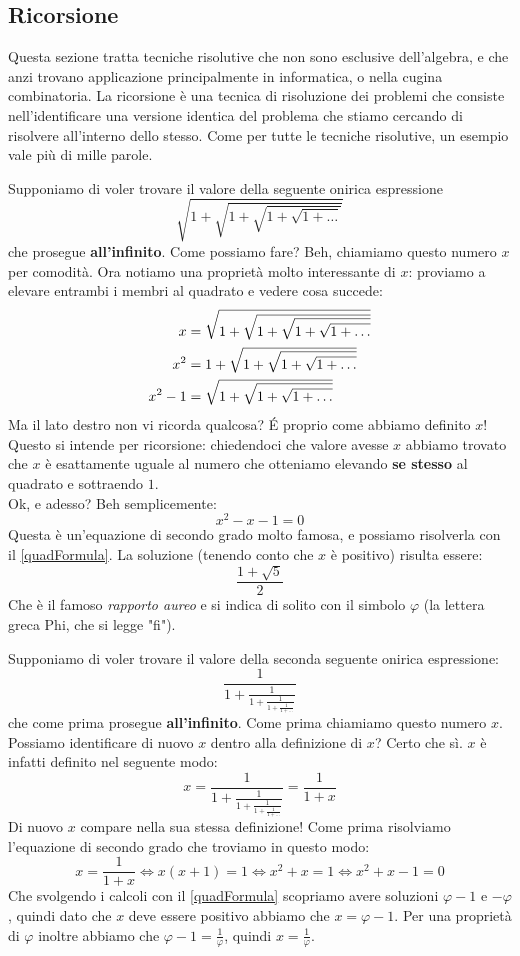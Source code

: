 \documentclass[11pt]{scrartcl}
\begin{document}
	\newpage
	
	\subsection{Ricorsione}
	Questa sezione tratta tecniche risolutive che non sono esclusive dell'algebra, e che anzi trovano applicazione principalmente in informatica, o nella cugina combinatoria.
	La ricorsione è una tecnica di risoluzione dei problemi che consiste nell'identificare una versione identica del problema che stiamo cercando di risolvere all'interno dello stesso. Come per tutte le tecniche risolutive, un esempio vale più di mille parole.
	\begin{example}
		Supponiamo di voler trovare il valore della seguente onirica espressione
		$$\sqrt{1+\sqrt{1+\sqrt{1+\sqrt{1+\dots}}}}$$
		che prosegue \textbf{all'infinito}. Come possiamo fare? Beh, chiamiamo questo numero $x$ per comodità. Ora notiamo una proprietà molto interessante di $x$: proviamo a elevare entrambi i membri al quadrato e vedere cosa succede:
		\begin{align}\notag
			x     & = \sqrt{1+\sqrt{1+\sqrt{1+\sqrt{1+\dots}}}} \\ \notag
			x^2   & = 1 + \sqrt{1+\sqrt{1+\sqrt{1+\dots}}} \\ \notag
			x^2-1 & = \sqrt{1+\sqrt{1+\sqrt{1+\dots}}}\notag
		\end{align}
		Ma il lato destro non vi ricorda qualcosa? \'E proprio come abbiamo definito $x$! \\
		Questo si intende per ricorsione: chiedendoci che valore avesse $x$ abbiamo trovato che $x$ è esattamente uguale al numero che otteniamo elevando \textbf{se stesso} al quadrato e sottraendo $1$.\\
		Ok, e adesso? Beh semplicemente:
		$$x^2-x-1=0$$ 
		Questa è un'equazione di secondo grado molto famosa, e possiamo risolverla con il \cref{quadFormula}. La soluzione (tenendo conto che $x$ è positivo) risulta essere:
		$$\frac{1+\sqrt{5}}{2}$$
		Che è il famoso \emph{rapporto aureo} e si indica di solito con il simbolo $\varphi$ (la lettera greca Phi, che si legge "fi").
	\end{example}
	\begin{example}
		Supponiamo di voler trovare il valore della seconda seguente onirica espressione:
		$$\frac{1}{1+\frac{1}{1+\frac{1}{1+\frac{1}{1+\dots}}}}$$
		che come prima prosegue \textbf{all'infinito}. Come prima chiamiamo questo numero $x$. Possiamo identificare di nuovo $x$ dentro alla definizione di $x$? Certo che sì. $x$ è infatti definito nel seguente modo:
		$$x=\frac{1}{1+\frac{1}{1+\frac{1}{1+\frac{1}{1+\dots}}}}=\frac{1}{1+x}$$
		Di nuovo $x$ compare nella sua stessa definizione! Come prima risolviamo l'equazione di secondo grado che troviamo in questo modo:
		$$x=\frac{1}{1+x}\iff x(x+1)=1 \iff x^2+x=1 \iff x^2+x-1=0$$
		Che svolgendo i calcoli con il \cref{quadFormula} scopriamo avere soluzioni $\varphi-1$ e $-\varphi$, quindi dato che $x$ deve essere positivo abbiamo che $x=\varphi-1$. Per una proprietà di $\varphi$ inoltre abbiamo che $\varphi-1=\frac{1}{\varphi}$, quindi $x=\frac{1}{\varphi}$.
	\end{example}
	\newpage
\end{document}
